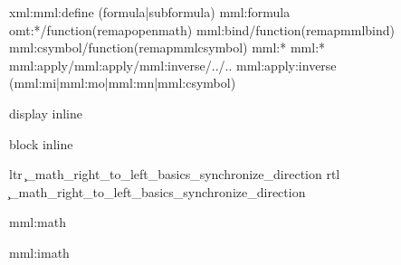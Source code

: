 
\unprotect

\usemodule[x][calcmath]



\setupxml[\c!entities=\v!yes] %

\def\ctxmodulemathml#1{\ctxlua{moduledata.mathml.#1}}

\startxmlsetups xml:mml:define
     {(formula|subformula)} {mml:formula}
     {omt:*/function(remapopenmath)}
     {mml:bind/function(remapmmlbind)}
     {mml:csymbol/function(remapmmlcsymbol)}
     {mml:*} {mml:*}
     {mml:apply/mml:apply/mml:inverse/../..} {mml:apply:inverse}
     {(mml:mi|mml:mo|mml:mn|mml:csymbol)}
\stopxmlsetups



    {display} {\displaymathematics} %
    {inline}  {\inlinemathematics }

 {block}   {\displaymathematics} %
 {inline}  {\inlinemathematics }

     {ltr}     {\setfalse\c_math_right_to_left\math_basics_synchronize_direction}
     {rtl}     {\settrue \c_math_right_to_left\math_basics_synchronize_direction}

\edef\mmlconstantone  {1}
\edef\mmlconstantfalse{false}

\startxmlsetups mml:math
    \begingroup
        \enableautofences
        \enableautofencemode
         {} {}
         {} {
             {} {
                \automathematics
            }
        }
        {
        }
    \endgroup
\stopxmlsetups

\startxmlsetups mml:imath
\stopxmlsetups

